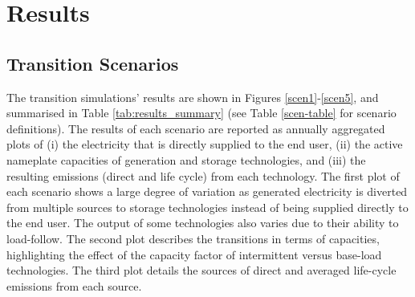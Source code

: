 \section{Results} \label{Results-and-discussion}

\subsection{Transition Scenarios}

The transition simulations' results are shown in Figures \ref{scen1}-\ref{scen5}, and summarised in Table \ref{tab:results_summary} (see Table \ref{scen-table} for scenario definitions). \DIFaddbegin {}\DIFaddend The results of each scenario are reported as annually aggregated plots of (i) the electricity that is directly supplied to the end user, (ii) the active nameplate capacities of generation and storage technologies, and (iii) the resulting emissions (direct and life cycle) from each technology. The first plot of each scenario shows a large degree of variation as generated electricity is diverted from multiple sources to storage technologies instead of being supplied directly to the end user. The output of some technologies also varies due to their ability to load-follow. The second plot describes the transitions in terms of capacities, highlighting the effect of the capacity factor of intermittent versus base-load technologies. The third plot details the sources of direct and averaged life-cycle emissions from each source.

